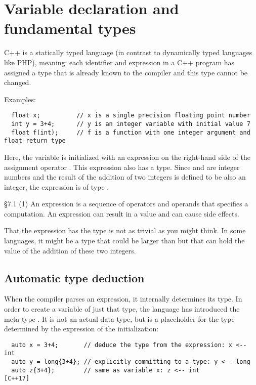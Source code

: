 \section{Variable declaration and fundamental types\label{sec:data-type}}
C++ is a statically typed language (in contrast to dynamically typed languages like \eg PHP), meaning: each identifier and expression in a
C++ program has assigned a type that is already known to the compiler and this type cannot be changed.

Examples:
\begin{verbatim}
  float x;          // x is a single precision floating point number
  int y = 3+4;      // y is an integer variable with initial value 7
  float f(int);     // f is a function with one integer argument and float return type
\end{verbatim}

Here, the variable  is initialized with an expression on the right-hand side of the assignment operator \cpp{=}. This
expression  also has a type. Since  and  are integer numbers and the result of the addition of two integers is
defined to be also an integer, the expression is of type .

\begin{standard}{\S 7.1 (1)}
  An expression is a sequence of operators and operands that specifies a computation. An expression can result in a value and can cause side effects.
\end{standard}

\begin{rem}
  That the expression  has the type  is not as trivial as you might think. In some languages, it might be a type that could be
  larger than  but that can hold the value of the addition of these two integers.
\end{rem}


\subsection{Automatic type deduction}
When the compiler parses an expression, it internally determines its type. In order to create a variable of just that type, the language has
introduced the meta-type . It is not an actual data-type, but is a placeholder for the type determined by the expression of the
initialization:
\begin{verbatim}
  auto x = 3+4;       // deduce the type from the expression: x <-- int
  auto y = long{3+4}; // explicitly committing to a type: y <-- long
  auto z{3+4};        // same as variable x: z <-- int                  [C++17]
\end{verbatim}

